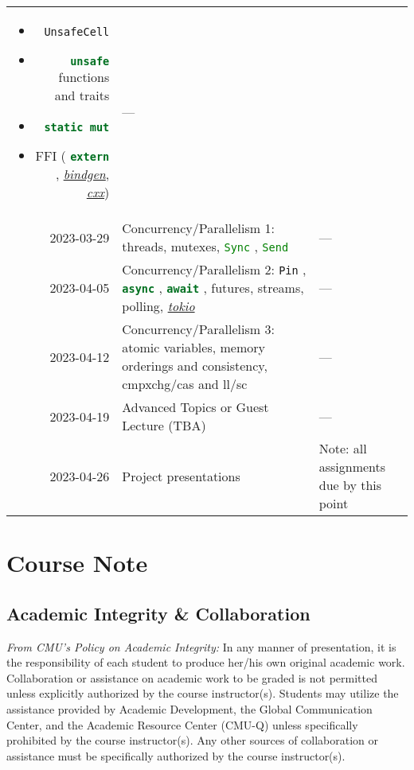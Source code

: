 \documentclass{article}
\newcommand{\code}[2][]{{\sloppy
\ifmmode
\text{\lstinline[language=rust,#1]`#2`}
\else
{\lstinline[language=rust,#1]`#2`}%
\fi}}
\begin{document}
\begin{longtable}{rp{}@{\hskip .05\textwidth}p{}}
\begin{itemize}
                        \item \code{UnsafeCell}
                        \item \code{unsafe} functions and traits
                        \item \code{static mut}
                        \item FFI (\code{extern},
                            \href{https://github.com/rust-lang/rust-bindgen}{\textit{bindgen}},
                            \href{https://github.com/dtolnay/cxx}{\textit{cxx}})
                    \end{itemize}
                & ---                                                       \\
    2023-03-29  & Concurrency/Parallelism 1: threads, mutexes,
                  \code{Sync}, \code{Send}
                & ---                                                       \\
    2023-04-05  & Concurrency/Parallelism 2: \code{Pin}, \code{async},
                  \code{await}, futures, streams, polling,
                  \href{https://tokio.rs/}{\textit{tokio}}
                & ---                                                       \\
    2023-04-12  & Concurrency/Parallelism 3: atomic variables, memory orderings
                  and consistency, cmpxchg/cas and ll/sc
                & ---                                                       \\
    2023-04-19  & Advanced Topics or Guest Lecture (TBA)
                & ---                                                       \\
    2023-04-26  & Project presentations
                & Note: all assignments due by this point                   \\
    \bottomrule
\end{longtable}

\section*{Course Note}

\subsection*{Academic Integrity \& Collaboration}

\textit{From CMU's Policy on Academic Integrity:} In any manner of presentation,
it is the responsibility of each student to produce her/his own original
academic work. Collaboration or assistance on academic work to be graded is not
permitted unless explicitly authorized by the course instructor(s). Students may
utilize the assistance provided by Academic Development, the Global
Communication Center, and the Academic Resource Center (CMU-Q) unless
specifically prohibited by the course instructor(s). Any other sources of
collaboration or assistance must be specifically authorized by the course
instructor(s).
 
\end{document}
